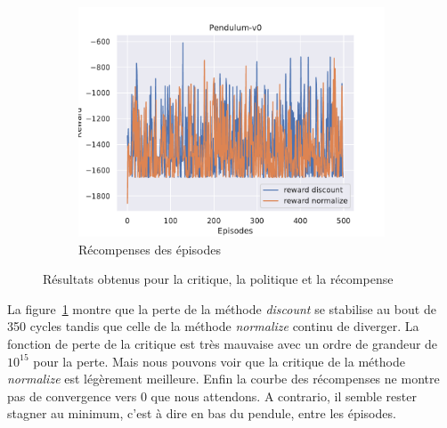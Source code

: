 \begin{figure}[H]
\begin{subfigure}{0.3\textwidth}
    \end{subfigure}
    \begin{subfigure}{0.3\textwidth}
        \includegraphics[width=\textwidth]{figures/iteration1/rewards_Pendulum-v0_pg_dataset_td_eval_True_cycles_500_trajs_20_batches_20_gamma_0.99_nstep_5_lr_act_0.01_lr_critic_0.01.pdf}
        \caption{Récompenses des épisodes}
    \end{subfigure}
    \caption{Résultats obtenus pour la critique, la politique et la récompense}
    \label{fig:attempt1_results}
\end{figure}

La figure~\ref{fig:attempt1_results} montre que la perte de la méthode \emph{discount} se stabilise au bout de 350 cycles tandis que celle de la méthode \emph{normalize} continu de diverger. La fonction de perte de la critique est très mauvaise avec un ordre de grandeur de $10^{15}$ pour la perte. Mais nous pouvons voir que la critique de la méthode \emph{normalize} est légèrement meilleure. Enfin la courbe des récompenses ne montre pas de convergence vers 0 que nous attendons. A contrario, il semble rester stagner au minimum, c'est à dire en bas du pendule, entre les épisodes.